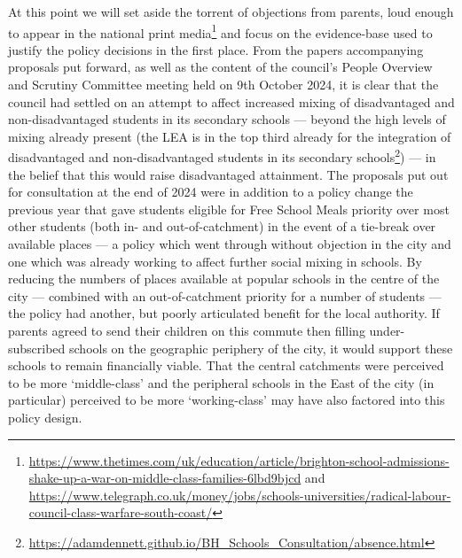 \documentclass[
  11pt,
]{article}
\begin{document}
At this point we will set aside the torrent of objections from parents,
loud enough to appear in the national print media\footnote{\url{https://www.thetimes.com/uk/education/article/brighton-school-admissions-shake-up-a-war-on-middle-class-families-6lbd9bjcd}
  and
  \url{https://www.telegraph.co.uk/money/jobs/schools-universities/radical-labour-council-class-warfare-south-coast/}}
and focus on the evidence-base used to justify the policy decisions in
the first place. From the papers accompanying proposals put forward, as
well as the content of the council's People Overview and Scrutiny
Committee meeting held on 9th October 2024, it is clear that the council
had settled on an attempt to affect increased mixing of disadvantaged
and non-disadvantaged students in its secondary schools --- beyond the
high levels of mixing already present (the LEA is in the top third
already for the integration of disadvantaged and non-disadvantaged
students in its secondary schools\footnote{\url{https://adamdennett.github.io/BH_Schools_Consultation/absence.html}})
--- in the belief that this would raise disadvantaged attainment. The
proposals put out for consultation at the end of 2024 were in addition
to a policy change the previous year that gave students eligible for
Free School Meals priority over most other students (both in- and
out-of-catchment) in the event of a tie-break over available places ---
a policy which went through without objection in the city and one which
was already working to affect further social mixing in schools. By
reducing the numbers of places available at popular schools in the
centre of the city --- combined with an out-of-catchment priority for a
number of students --- the policy had another, but poorly articulated
benefit for the local authority. If parents agreed to send their
children on this commute then filling under-subscribed schools on the
geographic periphery of the city, it would support these schools to
remain financially viable. That the central catchments were perceived to
be more `middle-class' and the peripheral schools in the East of the
city (in particular) perceived to be more `working-class' may have also
factored into this policy design.
\end{document}
